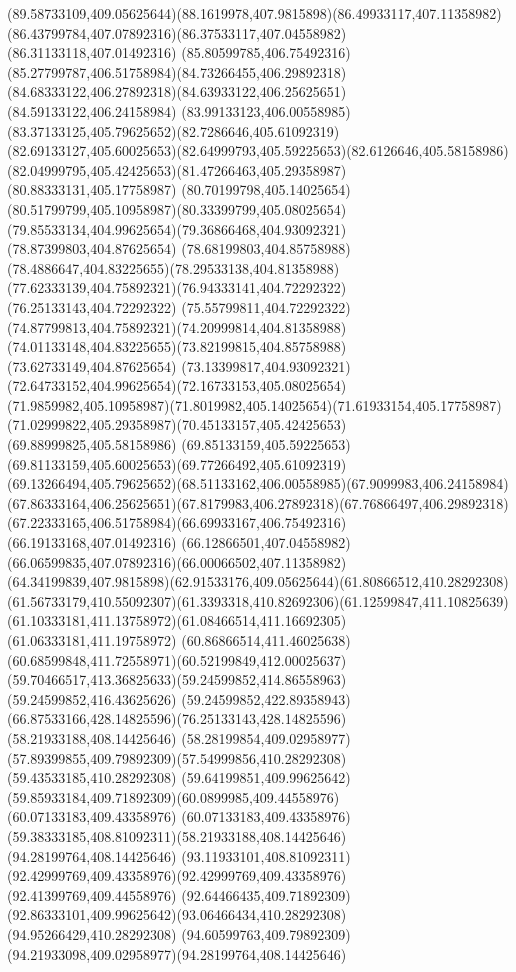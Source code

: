{{		\curveto(89.58733109,409.05625644)(88.1619978,407.9815898)(86.49933117,407.11358982)
		\curveto(86.43799784,407.07892316)(86.37533117,407.04558982)(86.31133118,407.01492316)
		\curveto(85.80599785,406.75492316)(85.27799787,406.51758984)(84.73266455,406.29892318)
		\curveto(84.68333122,406.27892318)(84.63933122,406.25625651)(84.59133122,406.24158984)
		\curveto(83.99133123,406.00558985)(83.37133125,405.79625652)(82.7286646,405.61092319)
		\curveto(82.69133127,405.60025653)(82.64999793,405.59225653)(82.6126646,405.58158986)
		\curveto(82.04999795,405.42425653)(81.47266463,405.29358987)(80.88333131,405.17758987)
		\curveto(80.70199798,405.14025654)(80.51799799,405.10958987)(80.33399799,405.08025654)
		\curveto(79.85533134,404.99625654)(79.36866468,404.93092321)(78.87399803,404.87625654)
		\curveto(78.68199803,404.85758988)(78.4886647,404.83225655)(78.29533138,404.81358988)
		\curveto(77.62333139,404.75892321)(76.94333141,404.72292322)(76.25133143,404.72292322)
		\curveto(75.55799811,404.72292322)(74.87799813,404.75892321)(74.20999814,404.81358988)
		\curveto(74.01133148,404.83225655)(73.82199815,404.85758988)(73.62733149,404.87625654)
		\curveto(73.13399817,404.93092321)(72.64733152,404.99625654)(72.16733153,405.08025654)
		\curveto(71.9859982,405.10958987)(71.8019982,405.14025654)(71.61933154,405.17758987)
		\curveto(71.02999822,405.29358987)(70.45133157,405.42425653)(69.88999825,405.58158986)
		\curveto(69.85133159,405.59225653)(69.81133159,405.60025653)(69.77266492,405.61092319)
		\curveto(69.13266494,405.79625652)(68.51133162,406.00558985)(67.9099983,406.24158984)
		\curveto(67.86333164,406.25625651)(67.8179983,406.27892318)(67.76866497,406.29892318)
		\curveto(67.22333165,406.51758984)(66.69933167,406.75492316)(66.19133168,407.01492316)
		\curveto(66.12866501,407.04558982)(66.06599835,407.07892316)(66.00066502,407.11358982)
		\curveto(64.34199839,407.9815898)(62.91533176,409.05625644)(61.80866512,410.28292308)
		\curveto(61.56733179,410.55092307)(61.3393318,410.82692306)(61.12599847,411.10825639)
		\curveto(61.10333181,411.13758972)(61.08466514,411.16692305)(61.06333181,411.19758972)
		\curveto(60.86866514,411.46025638)(60.68599848,411.72558971)(60.52199849,412.00025637)
		\curveto(59.70466517,413.36825633)(59.24599852,414.86558963)(59.24599852,416.43625626)
		\curveto(59.24599852,422.89358943)(66.87533166,428.14825596)(76.25133143,428.14825596)
		\moveto(58.21933188,408.14425646)
		\curveto(58.28199854,409.02958977)(57.89399855,409.79892309)(57.54999856,410.28292308)
		\lineto(59.43533185,410.28292308)
		\curveto(59.64199851,409.99625642)(59.85933184,409.71892309)(60.0899985,409.44558976)
		\lineto(60.07133183,409.43358976)
		\curveto(60.07133183,409.43358976)(59.38333185,408.81092311)(58.21933188,408.14425646)
		\moveto(94.28199764,408.14425646)
		\curveto(93.11933101,408.81092311)(92.42999769,409.43358976)(92.42999769,409.43358976)
		\lineto(92.41399769,409.44558976)
		\curveto(92.64466435,409.71892309)(92.86333101,409.99625642)(93.06466434,410.28292308)
		\lineto(94.95266429,410.28292308)
		\curveto(94.60599763,409.79892309)(94.21933098,409.02958977)(94.28199764,408.14425646)
	}
}
